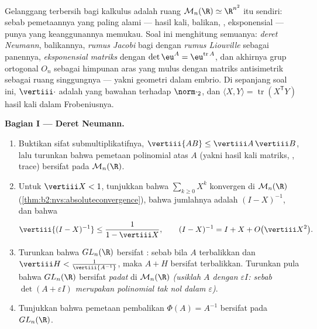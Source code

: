\begin{problem}\label{pb:b2:diffcalc:1}
Gelanggang terbersih bagi kalkulus  adalah ruang
$\mathcal M_n(\R) \simeq \R^{n^2}$ itu sendiri: sebab pemetaannya yang paling alami
--- hasil kali, balikan, , eksponensial --- punya
 yang keanggunannya memukau. Soal ini menghitung
semuanya: \emph{deret Neumann},  balikannya,
\emph{rumus Jacobi} bagi
 dengan \emph{rumus Liouville} sebagai panennya,
\emph{eksponensial matriks} dengan
$\det\eu^A = \eu^{\operatorname{tr}A}$, dan akhirnya
grup ortogonal $O_n$ sebagai himpunan aras yang mulus dengan
matriks antisimetrik sebagai ruang singgungnya --- yakni geometri
 dalam embrio. Di sepanjang soal ini, $\vertiii\cdot$ adalah  yang bawahan terhadap $\norm\cdot_2$, dan $\langle X, Y\rangle =
\operatorname{tr}(X^{\mathsf T}Y)$ hasil kali dalam Frobeniusnya.

\medskip
\noindent\textbf{Bagian I --- Deret Neumann.}
\begin{enumerate}
  \item Buktikan sifat submultiplikatifnya, $\vertiii{AB} \leq
        \vertiii A\,\vertiii B$, lalu turunkan bahwa pemetaan
        polinomial atas $A$ (yakni hasil kali matriks, , trace)
        bersifat  pada $\mathcal M_n(\R)$.
  \item Untuk $\vertiii X < 1$, tunjukkan bahwa $\sum_{k\geq0}X^k$
        konvergen  di $\mathcal M_n(\R)$
        (\cref{thm:b2:nvs:absoluteconvergence}), bahwa jumlahnya
        adalah $(I - X)^{-1}$, dan bahwa
        \[
        \vertiii{(I - X)^{-1}} \leq \frac{1}{1 - \vertiii X},
        \qquad
        (I - X)^{-1} = I + X + O\bigl(\vertiii X^2\bigr) .
        \]
  \item Turunkan bahwa $GL_n(\R)$ bersifat \emph{}: sebab bila $A$
        terbalikkan dan $\vertiii H <
        \frac{1}{\vertiii{A^{-1}}}$, maka $A + H$ bersifat
        terbalikkan. Turunkan pula bahwa $GL_n(\R)$ bersifat \emph{padat}
        di $\mathcal M_n(\R)$ \emph{(usiklah $A$ dengan
        $\varepsilon I$: sebab $\det(A + \varepsilon I)$ merupakan polinomial
        tak nol dalam $\varepsilon$)}.
  \item Tunjukkan bahwa pemetaan pembalikan $\Phi(A) = A^{-1}$ bersifat
         pada $GL_n(\R)$.
\end{enumerate}


\end{problem}
